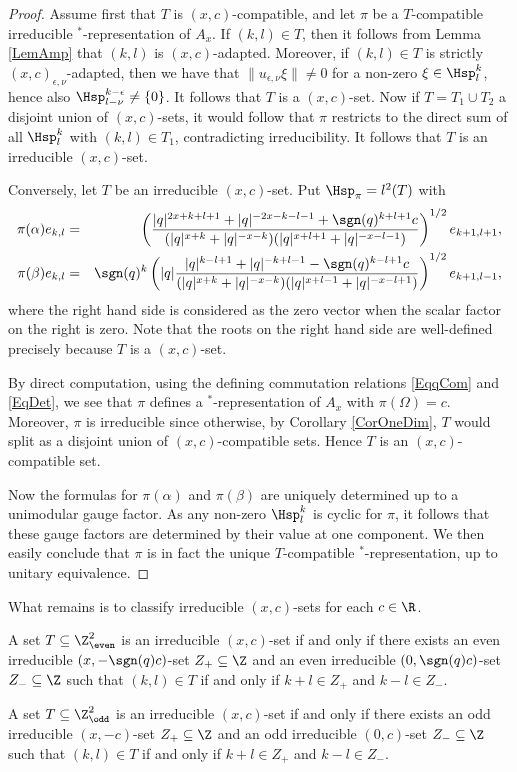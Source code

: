 \begin{proof} Assume first that $T$ is $(x,c)$-compatible, and let $\pi$ be a $T$-compatible irreducible $^*$-representation of $A_x$. If $(k,l)\in T$, then it follows from Lemma \ref{LemAmp} that $(k,l)$ is $(x,c)$-adapted. Moreover, if $(k,l)\in T$ is strictly $(x,c)_{\epsilon,\nu}$-adapted, then we have that $\|u_{\epsilon,\nu}\xi\|\neq 0$ for a non-zero $\xi\in \Hsp^k_l$, hence also $\Hsp^{k-\epsilon}_{l-\nu}\neq \{0\}$. It follows that $T$ is a $(x,c)$-set. Now if $T=T_1\cup T_2$ a disjoint union of $(x,c)$-sets, it would follow that $\pi$ restricts to the direct sum of all $\Hsp^k_l$ with $(k,l)\in T_1$, contradicting irreducibility. It follows that $T$ is an irreducible $(x,c)$-set.

Conversely, let $T$ be an irreducible $(x,c)$-set. Put $\Hsp_{\pi} = l^2(T)$ with \begin{eqnarray*} \pi(\alpha) e_{k,l} &=&  \left(\frac{|q|^{2x+k+l+1}+|q|^{-2x-k-l-1}+\sgn(q)^{k+l+1}c}{(|q|^{x+k}+|q|^{-x-k})(|q|^{x+l+1}+|q|^{-x-l-1})}\right)^{1/2}e_{k+1,l+1},\\ \pi(\beta) e_{k,l} &=& \sgn(q)^{k}\left(|q|\frac{|q|^{k-l+1}+|q|^{-k+l-1}-\sgn(q)^{k-l+1}c}{(|q|^{x+k}+|q|^{-x-k})(|q|^{x+l-1}+|q|^{-x-l+1})}\right)^{1/2} e_{k+1,l-1},\end{eqnarray*} where the right hand side is considered as the zero vector when the scalar factor on the right is zero. Note that the roots on the right hand side are well-defined precisely because $T$ is a $(x,c)$-set. 

By direct computation, using the defining commutation relations \eqref{EqqCom} and \eqref{EqDet}, we see that $\pi$ defines a $^*$-representation of $A_x$ with $\pi(\Omega) =c$. Moreover, $\pi$ is irreducible since otherwise, by Corollary \ref{CorOneDim}, $T$ would split as a disjoint union of $(x,c)$-compatible sets. Hence $T$ is an $(x,c)$-compatible set.

Now the formulas for $\pi(\alpha)$ and $\pi(\beta)$ are uniquely determined up to a unimodular gauge factor. As any non-zero $\Hsp^{k}_l$ is cyclic for $\pi$, it follows that these gauge factors are determined by their value at one component. We then easily conclude that $\pi$ is in fact the unique $T$-compatible $^*$-representation, up to unitary equivalence.
\end{proof}

What remains is to classify irreducible $(x,c)$-sets for each $c\in \R$. 

\begin{Lem}\label{LemClass2D} A set $T\subseteq \Z^2_{\even}$ is an irreducible $(x,c)$-set if and only if there exists an even irreducible $(x,-\sgn(q)c)$-set $Z_+\subseteq \Z$ and an even irreducible $(0,\sgn(q)c)$-set $Z_-\subseteq \Z$ such that $(k,l)\in T$ if and only if $k+l\in Z_+$ and $k-l\in Z_-$.

A set $T\subseteq \Z^2_{\odd}$ is an irreducible $(x,c)$-set if and only if there exists an odd irreducible $(x,-c)$-set $Z_+\subseteq \Z$ and an odd irreducible $(0,c)$-set $Z_-\subseteq \Z$ such that $(k,l)\in T$ if and only if $k+l\in Z_+$ and $k-l\in Z_-$.
\end{Lem} 

